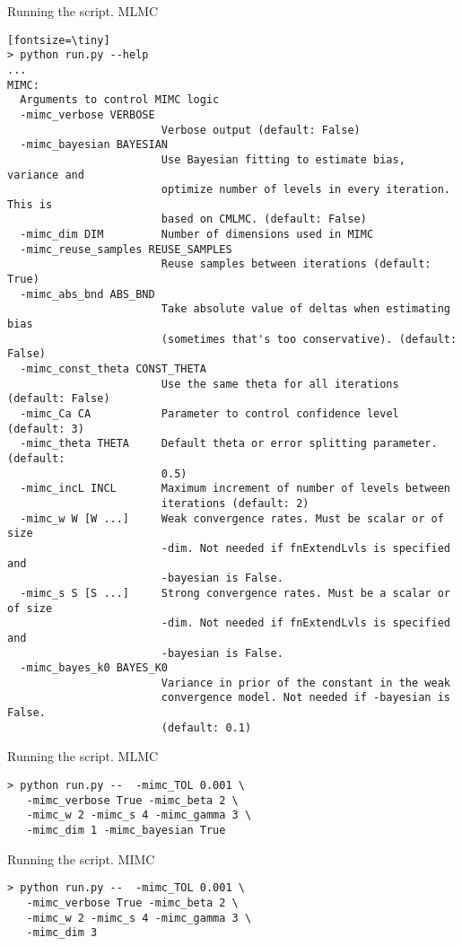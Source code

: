 \begin{frame}[fragile]{Running the script. MLMC}
\begin{verbatim}[fontsize=\tiny]
> python run.py --help
...
MIMC:
  Arguments to control MIMC logic
  -mimc_verbose VERBOSE
                        Verbose output (default: False)
  -mimc_bayesian BAYESIAN
                        Use Bayesian fitting to estimate bias, variance and
                        optimize number of levels in every iteration. This is
                        based on CMLMC. (default: False)
  -mimc_dim DIM         Number of dimensions used in MIMC
  -mimc_reuse_samples REUSE_SAMPLES
                        Reuse samples between iterations (default: True)
  -mimc_abs_bnd ABS_BND
                        Take absolute value of deltas when estimating bias
                        (sometimes that's too conservative). (default: False)
  -mimc_const_theta CONST_THETA
                        Use the same theta for all iterations (default: False)
  -mimc_Ca CA           Parameter to control confidence level (default: 3)
  -mimc_theta THETA     Default theta or error splitting parameter. (default:
                        0.5)
  -mimc_incL INCL       Maximum increment of number of levels between
                        iterations (default: 2)
  -mimc_w W [W ...]     Weak convergence rates. Must be scalar or of size
                        -dim. Not needed if fnExtendLvls is specified and
                        -bayesian is False.
  -mimc_s S [S ...]     Strong convergence rates. Must be a scalar or of size
                        -dim. Not needed if fnExtendLvls is specified and
                        -bayesian is False.
  -mimc_bayes_k0 BAYES_K0
                        Variance in prior of the constant in the weak
                        convergence model. Not needed if -bayesian is False.
                        (default: 0.1)
\end{verbatim}
\end{frame}


\begin{frame}[fragile]{Running the script. MLMC}
\begin{verbatim}
> python run.py --  -mimc_TOL 0.001 \
   -mimc_verbose True -mimc_beta 2 \
   -mimc_w 2 -mimc_s 4 -mimc_gamma 3 \
   -mimc_dim 1 -mimc_bayesian True
\end{verbatim}
\end{frame}

\begin{frame}[fragile]{Running the script. MIMC}
\begin{verbatim}
> python run.py --  -mimc_TOL 0.001 \
   -mimc_verbose True -mimc_beta 2 \
   -mimc_w 2 -mimc_s 4 -mimc_gamma 3 \
   -mimc_dim 3
\end{verbatim}
\end{frame}



